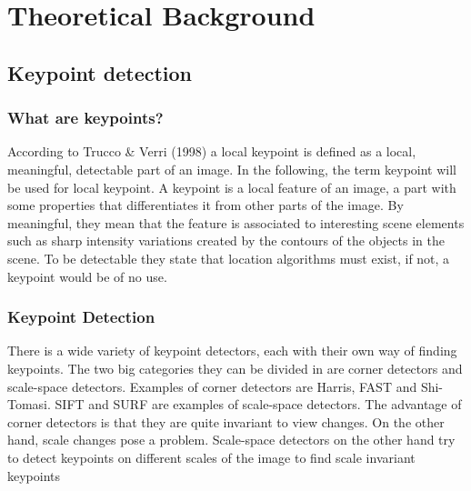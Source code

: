 \chapter{Theoretical Background}


\section{Keypoint detection}

\subsection{What are keypoints?}
According to Trucco \& Verri (1998) \cite{book} a local keypoint is defined as a local, meaningful, detectable part of an image. In the following, the term keypoint will be used for local keypoint. A keypoint is a local feature of an image, a part with some properties that differentiates it from other parts of the image. By meaningful, they mean that the feature is associated to interesting scene elements such as sharp intensity variations created by the contours of the objects in the scene. To be detectable they state that location algorithms must exist, if not, a keypoint would be of no use.

\subsection{Keypoint Detection}
There is a wide variety of keypoint detectors, each with their own way of finding keypoints. The two big categories they can be divided in are corner detectors and scale-space detectors. Examples of corner detectors are Harris, FAST and Shi-Tomasi. SIFT and SURF are examples of scale-space detectors. The advantage of corner detectors is that they are quite invariant to view changes. On the other hand, scale changes pose a problem. Scale-space detectors on the other hand try to detect keypoints on different scales of the image to find scale invariant keypoints

